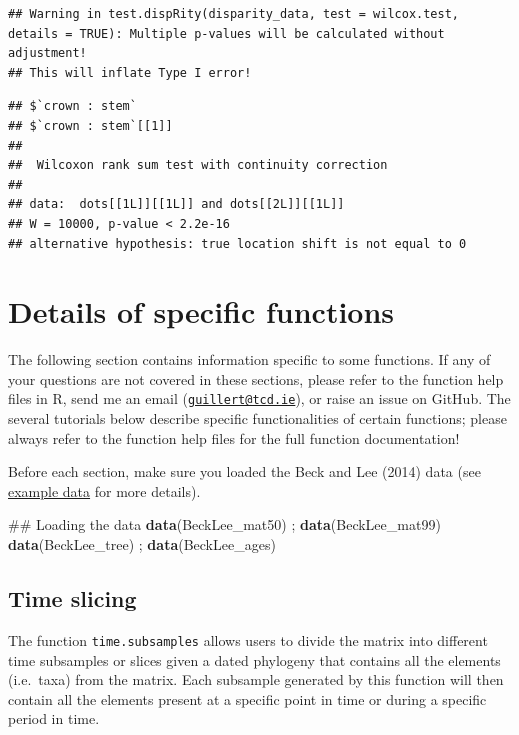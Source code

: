 \documentclass[]{book}
\newenvironment{Shaded}{\begin{snugshade}}{\end{snugshade}}
\newcommand{\KeywordTok}[1]{\textcolor[rgb]{0.13,0.29,0.53}{\textbf{#1}}}
\newcommand{\NormalTok}[1]{#1}
\theoremstyle{definition}
\theoremstyle{definition}
\theoremstyle{remark}
\begin{document}
\begin{verbatim}
## Warning in test.dispRity(disparity_data, test = wilcox.test, details = TRUE): Multiple p-values will be calculated without adjustment!
## This will inflate Type I error!
\end{verbatim}

\begin{verbatim}
## $`crown : stem`
## $`crown : stem`[[1]]
## 
##  Wilcoxon rank sum test with continuity correction
## 
## data:  dots[[1L]][[1L]] and dots[[2L]][[1L]]
## W = 10000, p-value < 2.2e-16
## alternative hypothesis: true location shift is not equal to 0
\end{verbatim}

\chapter{Details of specific
functions}\label{details-of-specific-functions}

The following section contains information specific to some functions.
If any of your questions are not covered in these sections, please refer
to the function help files in R, send me an email
(\href{mailto:guillert@tcd.ie}{\nolinkurl{guillert@tcd.ie}}), or raise
an issue on GitHub. The several tutorials below describe specific
functionalities of certain functions; please always refer to the
function help files for the full function documentation!

Before each section, make sure you loaded the Beck and Lee (2014) data
(see \protect\hyperlink{example-data}{example data} for more details).

\begin{Shaded}
\begin{Highlighting}[]
\NormalTok{## Loading the data}
\KeywordTok{data}\NormalTok{(BeckLee_mat50) ; }\KeywordTok{data}\NormalTok{(BeckLee_mat99)}
\KeywordTok{data}\NormalTok{(BeckLee_tree) ; }\KeywordTok{data}\NormalTok{(BeckLee_ages)}
\end{Highlighting}
\end{Shaded}

\hypertarget{time-slicing}{\section{Time slicing}\label{time-slicing}}

The function \texttt{time.subsamples} allows users to divide the matrix
into different time subsamples or slices given a dated phylogeny that
contains all the elements (i.e.~taxa) from the matrix. Each subsample
generated by this function will then contain all the elements present at
a specific point in time or during a specific period in time.
\end{document}
